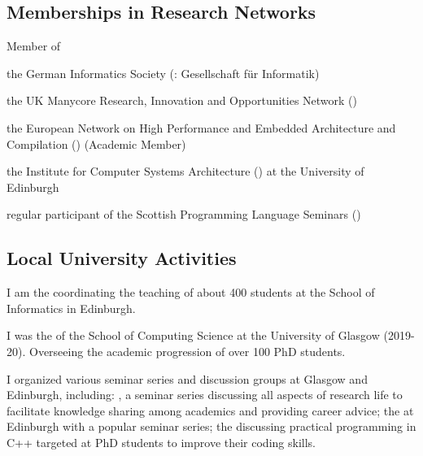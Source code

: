 \subsection{Memberships in Research Networks}
\begin{cvitemize}
    \item Member of
      \begin{inlineItemize}
        \item {}
        \item the German Informatics Society (\@: {\footnotesize Gesellschaft für Informatik})
        \item the UK Manycore Research, Innovation and Opportunities Network ()
        \item the European Network on High Performance and Embedded Architecture and Compilation () (Academic Member)
        \item the Institute for Computer Systems Architecture () at the University of Edinburgh
        \item regular participant of the Scottish Programming Language Seminars ()
      \end{inlineItemize}
\end{cvitemize}

\subsection{Local University Activities}
\begin{cvitemize}
  \item I am the  coordinating the teaching of about 400 students at the School of Informatics in Edinburgh.
\end{cvitemize}
\begin{cvitemize}
  \item I was the  of the School of Computing Science at the University of Glasgow ({\small 2019-20}).
        Overseeing the academic progression of over 100 PhD students.
\end{cvitemize}
\begin{cvitemize}
  \item I organized various seminar series and discussion groups at Glasgow and Edinburgh, including: , a seminar series discussing all aspects of research life to facilitate knowledge sharing among academics and providing career advice; the  at Edinburgh with a popular seminar series; the  discussing practical programming in C++ targeted at PhD students to improve their coding skills.
\end{cvitemize}
